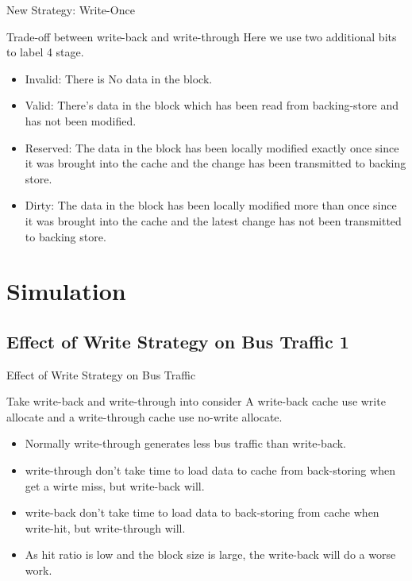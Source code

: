 \documentclass{beamer}
\begin{document}
\begin{frame}{New Strategy: Write-Once}
	\begin{block}{Trade-off between write-back and write-through}
		Here we use two additional bits to label 4 stage.
	\begin{itemize}
		\item {Invalid:  There is No data in the block.
			}
		\item{Valid: There's data in the block which has been read from backing-store and has not been modified.
		}
		\item{Reserved: The data in the block has been locally modified exactly once since it was brought into the cache and the change has been transmitted to backing store.}
		\item{Dirty: The data in the block has been locally modified more than once since it was brought into the cache and the latest change has not been transmitted to backing store.
		}
	\end{itemize}
	\end{block}
\end{frame}

\section{Simulation}
\subsection{Effect of Write Strategy on Bus Traffic 1}
\begin{frame}{Effect of Write Strategy on Bus Traffic}
	\begin{block}{Take write-back and write-through into consider}
		A write-back cache use write allocate and a write-through cache use no-write allocate.
	\end{block}
	\begin{itemize}
		\item{Normally write-through generates less bus traffic than write-back.}
		\item{write-through don't take time to load data to cache from back-storing when get a wirte miss, but write-back will.}
		\item{write-back don't take time to load data to back-storing from cache when write-hit, but write-through will.}
		\item{As hit ratio is low and the block size is large, the write-back will do a worse work.}
	\end{itemize}
\end{frame}
\end{document}
